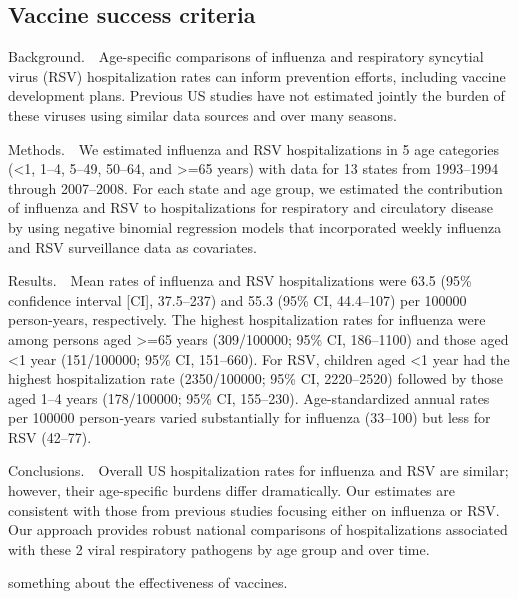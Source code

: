 \subsection{Vaccine success criteria}
\cite{zhouHospitalizationsAssociatedInfluenza2012}

Background. Age-specific comparisons of influenza and respiratory syncytial
virus (RSV) hospitalization rates can inform prevention efforts, including
vaccine development plans. Previous US studies have not estimated jointly the
burden of these viruses using similar data sources and over many seasons.

Methods. We estimated influenza and RSV hospitalizations in 5 age categories
(<1, 1–4, 5–49, 50–64, and >=65 years) with data for 13 states from 1993–1994
through 2007–2008. For each state and age group, we estimated the contribution
of influenza and RSV to hospitalizations for respiratory and circulatory
disease by using negative binomial regression models that incorporated weekly
influenza and RSV surveillance data as covariates.

Results. Mean rates of influenza and RSV hospitalizations were 63.5 (95\%
confidence interval [CI], 37.5–237) and 55.3 (95\% CI, 44.4–107) per 100000
person-years, respectively. The highest hospitalization rates for influenza
were among persons aged >=65 years (309/100000; 95\% CI, 186–1100) and those aged
<1 year (151/100000; 95\% CI, 151–660). For RSV, children aged <1 year had the
highest hospitalization rate (2350/100000; 95\% CI, 2220–2520) followed by those
aged 1–4 years (178/100000; 95\% CI, 155–230). Age-standardized annual rates per
100000 person-years varied substantially for influenza (33–100) but less for
RSV (42–77).

Conclusions. Overall US hospitalization rates for influenza and RSV are
similar; however, their age-specific burdens differ dramatically. Our estimates
are consistent with those from previous studies focusing either on influenza or
RSV. Our approach provides robust national comparisons of hospitalizations
associated with these 2 viral respiratory pathogens by age group and over time.

\cite{GuidanceIndustryClinical2007}
something about the effectiveness of vaccines.

\cite{dejongHaemagglutinationinhibitingAntibodyInfluenza2003}

